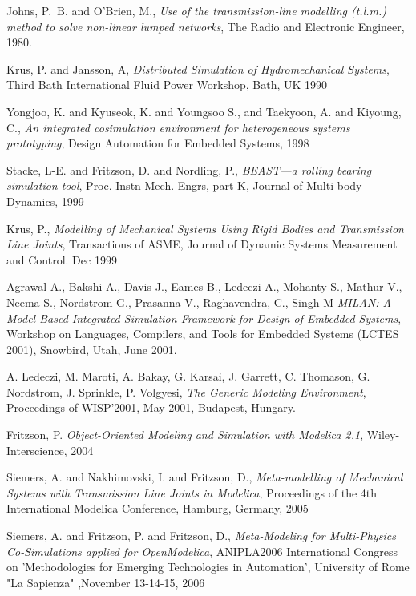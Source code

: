 \begin{thebibliography}{14}

	Johns, P.~B. and O'Brien, M.,
	{\em Use of the transmission-line modelling (t.l.m.) method to solve
  	non-linear lumped networks},
	The Radio and Electronic Engineer, 1980.

 Krus, P. and Jansson, A, {\em Distributed
	Simulation of Hydromechanical Systems}, Third Bath
	International Fluid Power Workshop, Bath, UK 1990

	Yongjoo, K. and Kyuseok, K. and Youngsoo S., and Taekyoon, A. and Kiyoung, C.,
  	{\em An integrated cosimulation environment for heterogeneous systems prototyping},
  	Design Automation for Embedded Systems, 1998

	Stacke, L-E. and Fritzson, D. and Nordling, P., {\em BEAST---a
	rolling bearing simulation tool}, Proc. Instn Mech. Engrs,
	part K, Journal of Multi-body Dynamics, 1999

 Krus, P., {\em Modelling of Mechanical Systems
	Using Rigid Bodies and Transmission Line Joints}, Transactions
	of ASME, Journal of Dynamic Systems Measurement and
	Control. Dec 1999

 Agrawal A., Bakshi A., Davis J., Eames B., Ledeczi
	A., Mohanty S., Mathur V., Neema S., Nordstrom G., Prasanna
	V., Raghavendra, C., Singh M {\em MILAN: A Model Based
	Integrated Simulation Framework for Design of Embedded
	Systems}, Workshop on Languages, Compilers, and Tools for
	Embedded Systems (LCTES 2001), Snowbird, Utah, June 2001.

 A. Ledeczi, M. Maroti, A. Bakay, G. Karsai, J. Garrett,
	C. Thomason, G. Nordstrom, J. Sprinkle, P. Volgyesi, {\em The
	Generic Modeling Environment}, Proceedings of WISP'2001, May
	2001, Budapest, Hungary.

 Fritzson, P. {\em Object-Oriented Modeling and
	Simulation with Modelica 2.1}, Wiley-Interscience, 2004

 Siemers, A. and Nakhimovski,
	I. and Fritzson, D., 
	{\em Meta-modelling of Mechanical Systems
	with Transmission Line Joints in Modelica}, Proceedings of the
	4th International Modelica Conference, Hamburg, Germany, 2005

 Siemers, A. and Fritzson, P. and  Fritzson, D., 
	{\em Meta-Modeling for Multi-Physics Co-Simulations applied
	for OpenModelica}, ANIPLA2006 International Congress on
	'Methodologies for Emerging Technologies in Automation',
	University of Rome "La Sapienza" ,November 13-14-15, 2006


\end{thebibliography}
